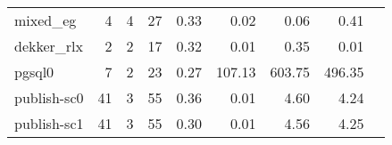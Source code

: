 {\begin{tabular}{l|r|r|r|r|r|r|r|l}
mixed\_eg                                   & 4                                                                                                 & 4                                                                                                & 27                                                                                                                   & 0.33                            & 0.02                    & {\color[HTML]{00009B} 0.06}    & 0.41                       &                                                         \\
dekker\_rlx                                 & 2                                                                                                 & 2                                                                                                & 17                                                                                                                   & 0.32                            & 0.01                    & {\color[HTML]{00009B} 0.35}    & 0.01                       &                                                         \cite{rcmc-POPL18}														\\
pgsql0                                      & 7                                                                                                 & 2                                                                                                & 23                                                                                                                   & 0.27                            & 107.13                  & {\color[HTML]{00009B} 603.75}  & 496.35                     & \cite{genmc-PLDI19}                                                   \\
publish-sc0                                 & 41                                                                                                & 3                                                                                                & 55                                                                                                                   & 0.36                            & 0.01                    & {\color[HTML]{00009B} 4.60}    & 4.24                       & \cite{genmc-PLDI19}                                                   \\
publish-sc1                                 & 41                                                                                                & 3                                                                                                & 55                                                                                                                   & 0.30                            & 0.01                    & {\color[HTML]{00009B} 4.56}    & 4.25                       & \cite{genmc-PLDI19}                                                   \\

\end{tabular}}
